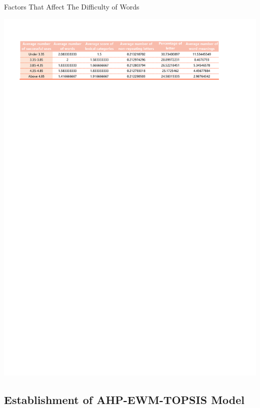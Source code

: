 \documentclass[12pt]{article}  %
\begin{document}
\begin{table}
\centering\caption{Factors That Affect The Difficulty of Words}\label{tf}
\includegraphics[width=\textwidth]{img/工作簿1.pdf}
\end{table}





\subsection{Establishment of AHP-EWM-TOPSIS Model}
\end{document}
